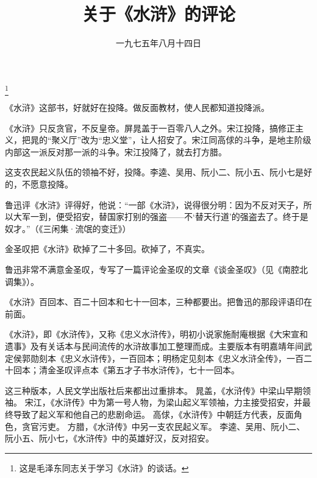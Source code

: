 
\title{关于《水浒》的评论}
\date{一九七五年八月十四日}
\thanks{这是毛泽东同志关于学习《水浒》的谈话。}
\maketitle


《水浒》这部书，好就好在投降。做反面教材，使人民都知道投降派。

《水浒》只反贪官，不反皇帝。屏晁盖于一百零八人之外。宋江投降，搞修正主义，把晁的“聚义厅”改为“忠义堂”，让人招安了。宋江同高俅的斗争，是地主阶级内部这一派反对那一派的斗争。宋江投降了，就去打方腊。

这支农民起义队伍的领袖不好，投降。李逵、吴用、阮小二、阮小五、阮小七是好的，不愿意投降。

鲁迅评《水浒》评得好，他说：“一部《水浒》，说得很分明：因为不反对天子，所以大军一到，便受招安，替国家打别的强盗——不‘替天行道’的强盗去了。终于是奴才。”（《三闲集·流氓的变迁》）

金圣叹把《水浒》砍掉了二十多回。砍掉了，不真实。

鲁迅非常不满意金圣叹，专写了一篇评论金圣叹的文章《谈金圣叹》（见《南腔北调集》）。

《水浒》百回本、百二十回本和七十一回本，三种都要出。把鲁迅的那段评语印在前面。

\begin{maonote}
《水浒》，即《水浒传》，又称《忠义水浒传》，明初小说家施耐庵根据《大宋宣和遗事》及有关话本与民间流传的水浒故事加工整理而成。主要版本有明嘉靖年间武定侯郭勋刻本《忠义水浒传》，一百回本；明杨定见刻本《忠义水浒全传》，一百二十回本；清金圣叹评点本《第五才子书水浒传》，七十一回本。

这三种版本，人民文学出版社后来都出过重排本。
晁盖，《水浒传》中梁山早期领袖。
宋江，《水浒传》中为第一号人物，为梁山起义军领袖，力主接受招安，并最终导致了起义军和他自己的悲剧命运。
高俅，《水浒传》中朝廷方代表，反面角色，贪官污吏。
方腊，《水浒传》中另一支农民起义军。
李逵、吴用、阮小二、阮小五、阮小七，《水浒传》中的英雄好汉，反对招安。
\end{maonote}
